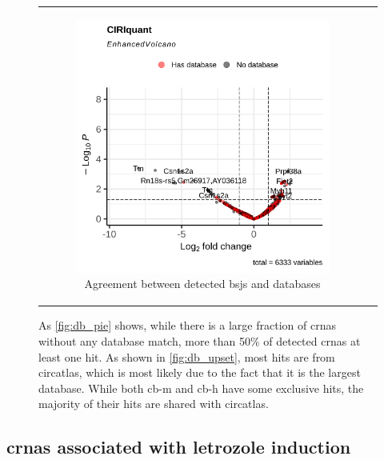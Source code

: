 \begin{figure}[ht]
\begin{tabular}{cc}
\begin{subfigure}{0.5\textwidth}
            \includegraphics[width=\linewidth]{chapters/4_results_and_discussion/figures/dea/ciriquant/tamoxifen/volcano.png}
            \caption{Agreement between detected
                \glspl{bsj} and databases}
            \label{fig:tamoxifen_volcano_ciriquant}
        \end{subfigure} &

    \end{tabular}
    \caption{As \cref{fig:db_pie} shows, while there is a large fraction of
        \glspl{crna} without any
        database match, more than 50\% of detected \glspl{crna} at least one
        hit.
        As shown in \cref{fig:db_upset}, most hits are from \gls{circatlas}, which is
        most likely due to the fact that it is the largest database.
        While both \gls{cb-m} and \gls{cb-h} have some exclusive hits, the majority of
        their hits are shared with \gls{circatlas}.
    }
    \label{fig:tamoxifen_volcano}
\end{figure}

\subsection{\Glspl{crna} associated with letrozole induction}

